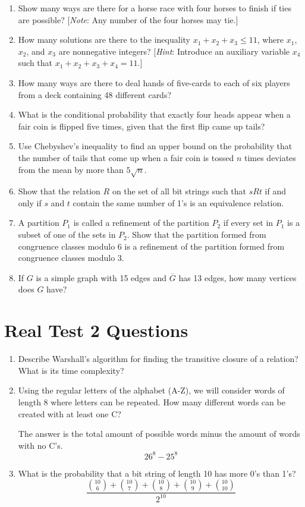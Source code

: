 \documentclass[letterpaper, 12pt]{article}
\begin{document}
\begin{enumerate}
    \item Show many ways are there for a horse race with four horses to finish if ties are possible? [\textit{Note}: Any number of the four horses may tie.]
    \item How many solutions are there to the inequality $x_1 + x_2 + x_3 \leq 11$, where $x_1$, $x_2$, and $x_3$ are nonnegative integers? [\textit{Hint}: Introduce an auxiliary variable $x_4$ such that $x_1 + x_2 + x_3 + x_4 = 11$.]
    \item How many ways are there to deal hands of five-cards to each of six players from a deck containing 48 different cards?
    \item What is the conditional probability that exactly four heads appear when a fair coin is flipped five times, given that the first flip came up tails?
    \item Use Chebyshev's inequality to find an upper bound on the probability that the number of tails that come up when a fair coin is tossed $n$ times deviates from the mean by more than $5\sqrt{n}$.
    \item Show that the relation $R$ on the set of all bit strings such that $sRt$ if and only if $s$ and $t$ contain the same number of 1's is an equivalence relation.
    \item A partition $P_1$ is called a refinement of the partition $P_2$ if every set in $P_1$ is a subset of one of the sets in $P_2$. Show that the partition formed from congruence classes modulo 6 is a refinement of the partition formed from congruence classes modulo 3.
    \item If $G$ is a simple graph with 15 edges and $\overline{G}$ has 13 edges, how many vertices does $G$ have?
\end{enumerate}

\section{Real Test 2 Questions}

\begin{enumerate}
    \item Describe Warshall's algorithm for finding the transitive closure of a relation? What is its time complexity?
    \item Using the regular letters of the alphabet (A-Z), we will consider words of length 8 where letters can be repeated. How many different words can be created with at least one C?

    The answer is the total amount of possible words minus the amount of words with no C's.
    \[26^8 - 25^8\]

    \item What is the probability that a bit string of length 10 has more 0's than 1's?
    \[\frac{\binom{10}{6} + \binom{10}{7} + \binom{10}{8} + \binom{10}{9} + \binom{10}{10}}{2^{10}}\]
\end{enumerate}
\end{document}
